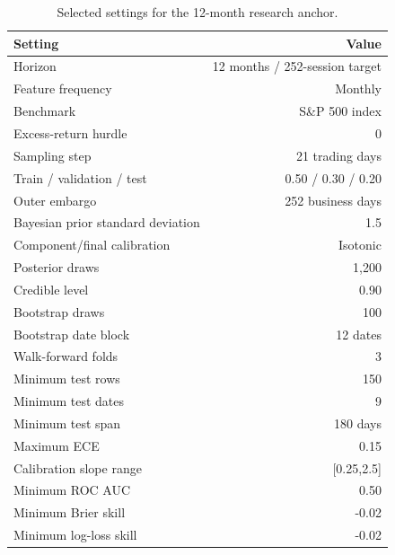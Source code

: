 \documentclass[11pt]{article}
\begin{document}
\begin{table}[tbp]
\centering
\small
\caption{Selected settings for the 12-month research anchor.}
\label{tab:anchorconfig}
\begin{tabular}{@{}lr@{}}
\toprule
Setting & Value \\
\midrule
Horizon & 12 months / 252-session target \\
Feature frequency & Monthly \\
Benchmark & S\&P 500 index \\
Excess-return hurdle & 0 \\
Sampling step & 21 trading days \\
Train / validation / test & 0.50 / 0.30 / 0.20 \\
Outer embargo & 252 business days \\
Bayesian prior standard deviation & 1.5 \\
Component/final calibration & Isotonic \\
Posterior draws & 1,200 \\
Credible level & 0.90 \\
Bootstrap draws & 100 \\
Bootstrap date block & 12 dates \\
Walk-forward folds & 3 \\
Minimum test rows & 150 \\
Minimum test dates & 9 \\
Minimum test span & 180 days \\
Maximum ECE & 0.15 \\
Calibration slope range & [0.25,2.5] \\
Minimum ROC AUC & 0.50 \\
Minimum Brier skill & -0.02 \\
Minimum log-loss skill & -0.02 \\
\bottomrule
\end{tabular}
\end{table}
\end{document}
